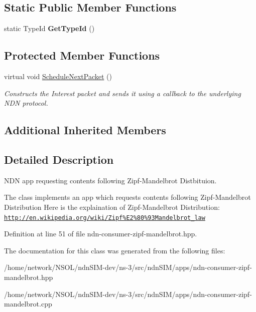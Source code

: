 \subsection*{Static Public Member Functions}
\begin{DoxyCompactItemize}
\item 
static Type\+Id {\bfseries Get\+Type\+Id} ()\hypertarget{classns3_1_1ndn_1_1ConsumerZipfMandelbrot_abdfb22cfc10543dfa1e0363adb8f7fad}{}\label{classns3_1_1ndn_1_1ConsumerZipfMandelbrot_abdfb22cfc10543dfa1e0363adb8f7fad}

\end{DoxyCompactItemize}
\subsection*{Protected Member Functions}
\begin{DoxyCompactItemize}
\item 
virtual void \hyperlink{classns3_1_1ndn_1_1ConsumerZipfMandelbrot_a1a80fa8278626f694ec5ea48fcfa866e}{Schedule\+Next\+Packet} ()\hypertarget{classns3_1_1ndn_1_1ConsumerZipfMandelbrot_a1a80fa8278626f694ec5ea48fcfa866e}{}\label{classns3_1_1ndn_1_1ConsumerZipfMandelbrot_a1a80fa8278626f694ec5ea48fcfa866e}

\begin{DoxyCompactList}\small\item\em Constructs the Interest packet and sends it using a callback to the underlying N\+DN protocol. \end{DoxyCompactList}\end{DoxyCompactItemize}
\subsection*{Additional Inherited Members}


\subsection{Detailed Description}
N\+DN app requesting contents following Zipf-\/\+Mandelbrot Distbituion. 

The class implements an app which requests contents following Zipf-\/\+Mandelbrot Distribution Here is the explaination of Zipf-\/\+Mandelbrot Distribution\+: \href{http://en.wikipedia.org/wiki/Zipf%E2%80%93Mandelbrot_law}{\tt http\+://en.\+wikipedia.\+org/wiki/\+Zipf\%\+E2\%80\%93\+Mandelbrot\+\_\+law} 

Definition at line 51 of file ndn-\/consumer-\/zipf-\/mandelbrot.\+hpp.



The documentation for this class was generated from the following files\+:\begin{DoxyCompactItemize}
\item 
/home/network/\+N\+S\+O\+L/ndn\+S\+I\+M-\/dev/ns-\/3/src/ndn\+S\+I\+M/apps/ndn-\/consumer-\/zipf-\/mandelbrot.\+hpp\item 
/home/network/\+N\+S\+O\+L/ndn\+S\+I\+M-\/dev/ns-\/3/src/ndn\+S\+I\+M/apps/ndn-\/consumer-\/zipf-\/mandelbrot.\+cpp\end{DoxyCompactItemize}

